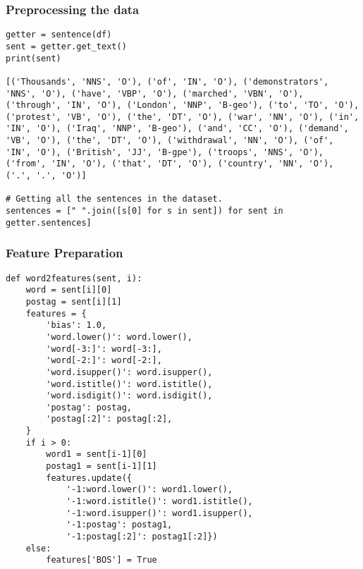 \begin{frame}[fragile]\frametitle{Preprocessing the data}


\begin{lstlisting}
getter = sentence(df)
sent = getter.get_text()
print(sent)

[('Thousands', 'NNS', 'O'), ('of', 'IN', 'O'), ('demonstrators', 'NNS', 'O'), ('have', 'VBP', 'O'), ('marched', 'VBN', 'O'), ('through', 'IN', 'O'), ('London', 'NNP', 'B-geo'), ('to', 'TO', 'O'), ('protest', 'VB', 'O'), ('the', 'DT', 'O'), ('war', 'NN', 'O'), ('in', 'IN', 'O'), ('Iraq', 'NNP', 'B-geo'), ('and', 'CC', 'O'), ('demand', 'VB', 'O'), ('the', 'DT', 'O'), ('withdrawal', 'NN', 'O'), ('of', 'IN', 'O'), ('British', 'JJ', 'B-gpe'), ('troops', 'NNS', 'O'), ('from', 'IN', 'O'), ('that', 'DT', 'O'), ('country', 'NN', 'O'), ('.', '.', 'O')]

# Getting all the sentences in the dataset.
sentences = [" ".join([s[0] for s in sent]) for sent in getter.sentences]

\end{lstlisting}
\end{frame}

\begin{frame}[fragile]\frametitle{Feature Preparation}


\begin{lstlisting}
def word2features(sent, i):
    word = sent[i][0]
    postag = sent[i][1]
    features = {
        'bias': 1.0,
        'word.lower()': word.lower(),
        'word[-3:]': word[-3:],
        'word[-2:]': word[-2:],
        'word.isupper()': word.isupper(),
        'word.istitle()': word.istitle(),
        'word.isdigit()': word.isdigit(),
        'postag': postag,
        'postag[:2]': postag[:2],
    }
    if i > 0:
        word1 = sent[i-1][0]
        postag1 = sent[i-1][1]
        features.update({
            '-1:word.lower()': word1.lower(),
            '-1:word.istitle()': word1.istitle(),
            '-1:word.isupper()': word1.isupper(),
            '-1:postag': postag1,
            '-1:postag[:2]': postag1[:2]})
    else:
        features['BOS'] = True
\end{lstlisting}
\end{frame}


